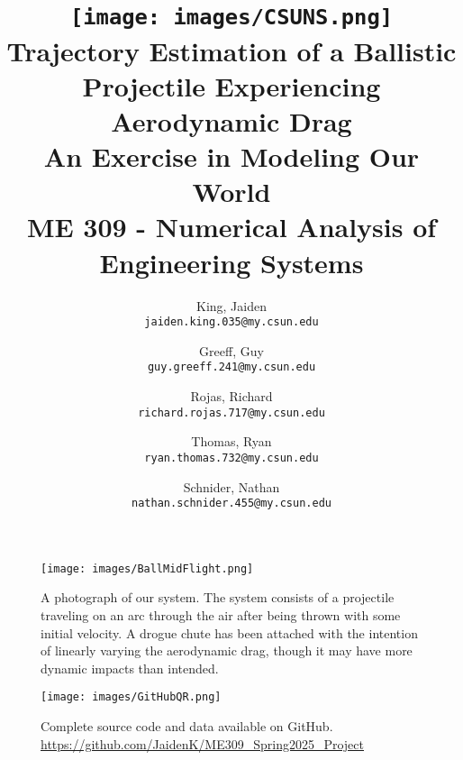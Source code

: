 \documentclass[12pt,english]{report}
\author{
	King, Jaiden\\
	\texttt{jaiden.king.035@my.csun.edu}
	\and
	Greeff, Guy\\
	\texttt{guy.greeff.241@my.csun.edu}
	\and
	Rojas, Richard\\
	\texttt{richard.rojas.717@my.csun.edu}
	\and
	Thomas, Ryan\\
	\texttt{ryan.thomas.732@my.csun.edu}
	\and
	Schnider, Nathan\\
	\texttt{nathan.schnider.455@my.csun.edu}
}
\title{\texttt{[image: images/CSUNS.png]}\\
Trajectory Estimation of a Ballistic Projectile Experiencing Aerodynamic Drag\\\large{An Exercise in Modeling Our World\\ME 309 - Numerical Analysis of Engineering Systems}}
\begin{document}
\maketitle

\tableofcontents

\begin{figure}[t]
\centering
\texttt{[image: images/BallMidFlight.png]}
\caption{\label{fig:BallMidFlight} A photograph of our system. The system consists of a projectile traveling on an arc through the air after being thrown with some initial velocity. A drogue chute has been attached with the intention of linearly varying the aerodynamic drag, though it may have more dynamic impacts than intended.}
\end{figure}

\begin{figure}[t]
\centering
\texttt{[image: images/GitHubQR.png]}
\caption{\label{fig:GitHubQR} Complete source code and data available on GitHub. \href{https://github.com/JaidenK/ME309\_Spring2025\_Project}{https://github.com/JaidenK/ME309\_Spring2025\_Project}}
\end{figure}















\end{document}
